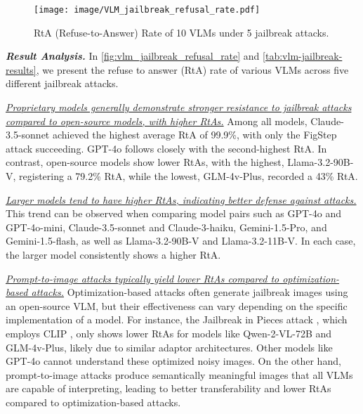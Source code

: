 \setlength{\intextsep}{-1pt}
\begin{wrapfigure}{r}{0.5\textwidth}
        \centering
        \texttt{[image: image/VLM\_jailbreak\_refusal\_rate.pdf]} %
        \caption{RtA (Refuse-to-Answer) Rate of 10 VLMs under 5 jailbreak attacks.}
        \label{fig:vlm_jailbreak_refusal_rate}
        \vspace{-15pt}
\end{wrapfigure}



\textit{\textbf{Result Analysis.}} In \autoref{fig:vlm_jailbreak_refusal_rate} and \autoref{tab:vlm-jailbreak-results}, we present the refuse to answer (RtA) rate of various VLMs across five different jailbreak attacks.

\textit{\ul{Proprietary models generally demonstrate stronger resistance to jailbreak attacks compared to open-source models, with higher RtAs.}} Among all models, Claude-3.5-sonnet achieved the highest average RtA of 99.9\%, with only the FigStep attack succeeding. GPT-4o follows closely with the second-highest RtA. In contrast, open-source models show lower RtAs, with the highest, Llama-3.2-90B-V, registering a 79.2\% RtA, while the lowest, GLM-4v-Plus, recorded a 43\% RtA.

\textit{\ul{Larger models tend to have higher RtAs, indicating better defense against attacks.}} This trend can be observed when comparing model pairs such as GPT-4o and GPT-4o-mini, Claude-3.5-sonnet and Claude-3-haiku, Gemini-1.5-Pro, and Gemini-1.5-flash, as well as Llama-3.2-90B-V and Llama-3.2-11B-V. In each case, the larger model consistently shows a higher RtA.

\textit{\ul{Prompt-to-image attacks typically yield lower RtAs compared to optimization-based attacks.}} Optimization-based attacks often generate jailbreak images using an open-source VLM, but their effectiveness can vary depending on the specific implementation of a model. For instance, the Jailbreak in Pieces attack \cite{shayegani2023jailbreak}, which employs CLIP \cite{radford2021learning}, only shows lower RtAs for models like Qwen-2-VL-72B and GLM-4v-Plus, likely due to similar adaptor architectures. Other models like GPT-4o cannot understand these optimized noisy images. On the other hand, prompt-to-image attacks produce semantically meaningful images that all VLMs are capable of interpreting, leading to better transferability and lower RtAs compared to optimization-based attacks.


